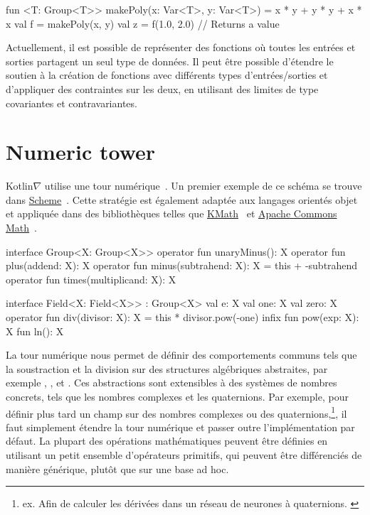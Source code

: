 \begin{kotlinlisting}
fun <T: Group<T>> makePoly(x: Var<T>, y: Var<T>) = x * y + y * y + x * x
val f = makePoly(x, y)
val z = f(1.0, 2.0) // Returns a value
\end{kotlinlisting}
%
Actuellement, il est possible de représenter des fonctions où toutes les entrées et sorties partagent un seul type de données. Il peut être possible d'étendre le soutien à la création de fonctions avec différents types d'entrées/sorties et d'appliquer des contraintes sur les deux, en utilisant des limites de type covariantes et contravariantes.

\section{Numeric tower}\label{sec:numeric-tower}

Kotlin$\nabla$ utilise une tour numérique~\citep{st2012typing}. Un premier exemple de ce schéma se trouve dans \href{https://www.gnu.org/software/guile/manual/html_node/Numerical-Tower.html}{Scheme}~\citep{sperber2009revised}. Cette stratégie est également adaptée aux langages orientés objet~\citep{niculescu2003design, niculescu2011using, kennedy2005generalized} et appliquée dans des bibliothèques telles que \href{https://github.com/mipt-npm/kmath}{KMath}~\citep{nozik2019kmath} et \href{https://commons.apache.org/proper/commons-math/}{Apache Commons Math}~\citep{developers2012apache}.

\begin{kotlinlisting}
interface Group<X: Group<X>> {
    operator fun unaryMinus(): X
    operator fun plus(addend: X): X
    operator fun minus(subtrahend: X): X = this + -subtrahend
    operator fun times(multiplicand: X): X
}

interface Field<X: Field<X>> : Group<X> {
    val e: X
    val one: X
    val zero: X
    operator fun div(divisor: X): X = this * divisor.pow(-one)
    infix fun pow(exp: X): X
    fun ln(): X
}
\end{kotlinlisting}
%
La tour numérique nous permet de définir des comportements communs tels que la soustraction et la division sur des structures algébriques abstraites, par exemple , , et . Ces abstractions sont extensibles à des systèmes de nombres concrets, tels que les nombres complexes et les quaternions. Par exemple, pour définir plus tard un champ sur des nombres complexes ou des quaternions,\hspace{-.08em}\footnote{ex. Afin de calculer les dérivées dans un réseau de neurones à quaternions. \citep{isokawa2003quaternion}}, il faut simplement étendre la tour numérique et passer outre l'implémentation par défaut. La plupart des opérations mathématiques peuvent être définies en utilisant un petit ensemble d'opérateurs primitifs, qui peuvent être différenciés de manière générique, plutôt que sur une base ad hoc.


